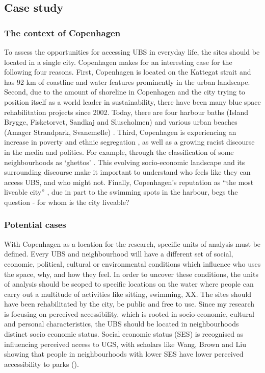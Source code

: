 \documentclass{article}
\begin{document}
\subsection{Case study}

\subsubsection{The context of Copenhagen}

To assess the opportunities for accessing UBS in everyday life, the sites should be located in a single city. Copenhagen makes for an interesting case for the following four reasons. First, Copenhagen is located on the Kattegat strait and has 92 km of coastline \parencite{Comertler2017} and water features prominently in the urban landscape. Second, due to the amount of shoreline in Copenhagen and the city trying to position itself as a world leader in sustainability, there have been many blue space rehabilitation projects since 2002. Today, there are four harbour baths (Island Brygge, Fisketorvet, Sandkaj and Sluseholmen) and various urban beaches (Amager Strandpark, Svanemølle) \parencite{VisitCopenhagen}. Third, Copenhagen is experiencing an increase in poverty and ethnic segregation \parencite{Moller and Larsen 2015}, as well as a growing racist discourse in the media and politics. For example, through the classification of some neighbourhoods as ‘ghettos’ \parencite{Simonsen 2008}. This evolving socio-economic landscape and its surrounding discourse make it important to understand who feels like they can access UBS, and who might not. Finally, Copenhagen’s reputation as “the most liveable city” \parencite{VisitDenmark 2021}, due in part to the swimming spots in the harbour, begs the question - for whom is the city liveable?

\subsubsection{Potential cases}

With Copenhagen as a location for the research, specific units of analysis must be defined. Every UBS and neighbourhood will have a different set of social, economic, political, cultural or environmental conditions which influence who uses the space, why, and how they feel. In order to uncover these conditions, the units of analysis should be scoped to specific locations on the water where people can carry out a multitude of activities like sitting, swimming, XX. The sites should have been rehabilitated by the city, be public and free to use. 
Since my research is focusing on perceived accessibility, which is rooted in socio-economic, cultural and personal characteristics, the UBS should be located in neighbourhoods distinct socio economic status. Social economic status (SES) is recognised as influencing perceived access to UGS, with scholars like Wang, Brown and Liu showing that people in neighbourhoods with lower SES have lower perceived accessibility to parks (\citeyear{wang2015physical}).
\end{document}

